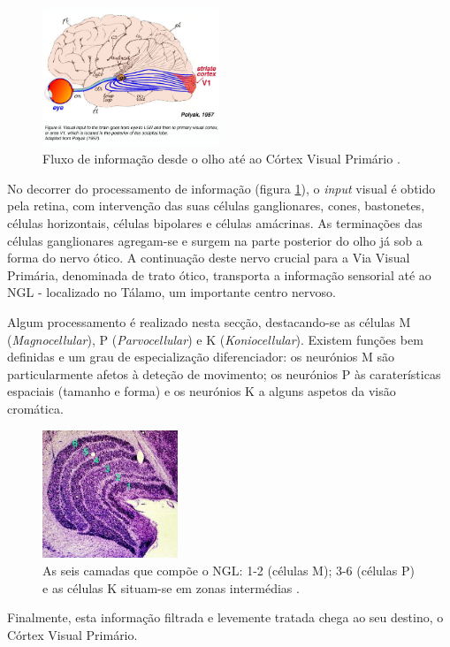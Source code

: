 \begin{figure}[h]
\centering
\includegraphics[width=150pt]{cortex.jpg}
\caption{Fluxo de informação desde o olho até ao Córtex Visual Primário \cite{cortex_site}.}
\label{fig:cortex}
\end{figure}

\noindent No decorrer do processamento de informação (figura \ref{fig:cortex}), o \textit{input} visual é obtido pela retina, com intervenção das suas células ganglionares, cones, bastonetes, células horizontais, células bipolares e células amácrinas. As terminações das células ganglionares agregam-se e surgem na parte posterior do olho já sob a forma do nervo ótico. A continuação deste nervo crucial para a Via Visual Primária, denominada de trato ótico, transporta a informação sensorial até ao \ac{NGL} - localizado no Tálamo, um importante centro nervoso.

\noindent Algum processamento é realizado nesta secção, destacando-se as células M (\textit{Magnocellular}), P (\textit{Parvocellular}) e K (\textit{Koniocellular}). Existem funções bem definidas e um grau de especialização diferenciador: os neurónios M são particularmente afetos à deteção de movimento; os neurónios P às caraterísticas espaciais (tamanho e forma) e os neurónios K a alguns aspetos da visão cromática.

\begin{figure}[h]
\centering
\includegraphics[width=115pt]{m_p_k_cells.jpg}
\caption{As seis camadas que compõe o \ac{NGL}: 1-2 (células M); 3-6 (células P) e as células K situam-se em zonas intermédias \cite{cells}.}
\label{fig:via_visual}
\end{figure}

\noindent Finalmente, esta informação filtrada e levemente tratada chega ao seu destino, o Córtex Visual Primário.


